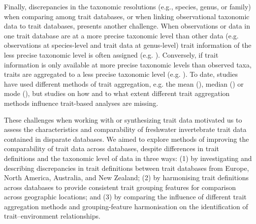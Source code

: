 \documentclass{article}
\begin{document}
Finally, discrepancies in the taxonomic resolutions (e.g., species, genus, or family) when comparing among trait databases, or when linking observational taxonomic data to trait databases, presents another challenge. When observations or data in one trait database are at a more precise taxonomic level than other data (e.g. observations at species-level and trait data at genus-level) trait information of the less precise taxonomic level is often assigned (e.g. \cite{szocs_effects_2014, vos_taxonomic_2017}). Conversely, if trait information is only available at more precise taxonomic levels than observed taxa, traits are aggregated to a less precise taxonomic level (e.g. \cite{aspin_extreme_2019, piliere_a._f._h._importance_2016, poff_functional_2006, szocs_effects_2014}). To date, studies have used different methods of trait aggregation, e.g. the mean (\cite{magliozzi_functional_2019}), median (\cite{szocs_effects_2014}) or mode (\cite{piliere_a._f._h._importance_2016}), but studies on how and to what extent different trait aggregation methods influence trait-based analyses are missing. 

These challenges when working with or synthesizing trait data motivated us to assess the characteristics and comparability of freshwater invertebrate trait data contained in disparate databases. We aimed to explore methods of improving the comparability of trait data across databases, despite differences in trait definitions and the taxonomic level of data in three ways: (1) by investigating and describing discrepancies in trait definitions between trait databases from Europe, North America, Australia, and New Zealand; (2) by harmonising trait definitions across databases to provide consistent trait grouping features for comparison across geographic locations; and (3) by comparing the influence of different trait aggregation methods and grouping-feature harmonisation on the identification of trait–environment relationships.

\end{document}
